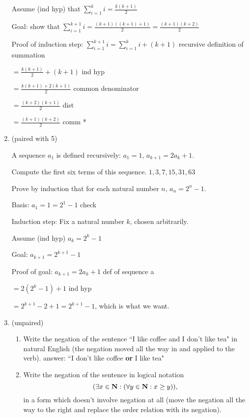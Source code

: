 \documentclass[12pt]{article}
\begin{document}
\begin{enumerate}
Assume (ind hyp) that $\sum_{i=1}^k i = \frac{k(k+1)}2$

Goal:  show that $\sum_{i=1}^{k+1} i = \frac{(k+1)((k+1)+1)}2 = \frac{(k+1)(k+2)}2$

Proof of induction step:  $\sum_{i=1}^{k+1} i = \sum_{i=1}^{k} i +(k+1)$  recursive definition of summation

$= \frac{k(k+1)}2 + (k+1)$  ind hyp

$= \frac{k(k+1)+ 2(k+1)}2$ common denominator

$= \frac{(k+2)(k+1)}2$  dist

$= \frac{(k+1)(k+2)}2$  comm *

\newpage

\item (paired with 5)   

A sequence $a_1$ is defined recursively:  $a_1=1$, $a_{k+1} = 2a_k+1$.  

Compute the first six terms of this sequence.  $1, 3, 7, 15, 31, 63$

Prove by induction that for each natural number $n$, $a_n = 2^n-1$.

Basis:  $a_1 = 1 = 2^1-1$ check

Induction step:  Fix a natural number $k$, chosen arbitrarily.

Assume (ind hyp)  $a_k = 2^k -1$

Goal: $a_{k+1} = 2^{k+1} -1$

Proof of goal:  $a_{k+1} = 2a_k +1$  def of sequence a

$= 2(2^k-1)+1$ ind hyp

$= 2^{k+1}-2+1 = 2^{k+1}-1$, which is what we want.

\newpage

\item (unpaired)

\begin{enumerate}

\item  Write the negation of the sentence ``I like coffee and I don't like tea" in natural English (the negation moved all the way in and applied to the verb).  answer:  ``I don't like coffee {\bf or} I like tea"

\item  Write the negation of the sentence in logical notation $$(\exists x \in {\bf N}:(\forall y \in {\bf N}: x \geq y)),$$ in a form which doesn't involve negation at all (move the negation all the way to the right and replace the order relation with its negation).


\end{enumerate}
\end{enumerate}
\end{document}

